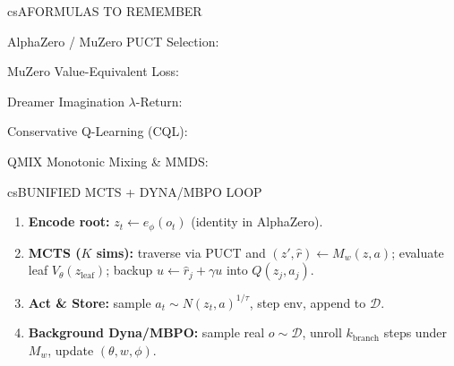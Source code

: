 \documentclass[../../../../master.tex]{subfiles}
\begin{document}
\begin{cscolumns}
\begin{cscard}{csA}{FORMULAS TO REMEMBER}
  \begin{csbul}
    \item AlphaZero / MuZero PUCT Selection:
    \item MuZero Value-Equivalent Loss:
    \item Dreamer Imagination $\lambda$-Return:
    \item Conservative Q-Learning (CQL):
    \item QMIX Monotonic Mixing \& MMDS:
  \end{csbul}
\end{cscard}

\begin{cscard}{csB}{UNIFIED MCTS + DYNA/MBPO LOOP}
  \begin{enumerate}[leftmargin=1.2em, itemsep=1pt, topsep=1pt, parsep=0pt]
    \item \textbf{Encode root:} $z_t \leftarrow e_\phi(o_t)$ (identity in AlphaZero).
    \item \textbf{MCTS ($K$ sims):} traverse via PUCT and $(z',\hat{r})\leftarrow M_w(z,a)$; evaluate leaf $V_\theta(z_{\mathrm{leaf}})$; backup $u\leftarrow \hat{r}_j+\gamma u$ into $Q(z_j,a_j)$.
    \item \textbf{Act \& Store:} sample $a_t\sim N(z_t,a)^{1/\tau}$, step env, append to $\mathcal{D}$.
    \item \textbf{Background Dyna/MBPO:} sample real $o\sim\mathcal{D}$, unroll $k_{\mathrm{branch}}$ steps under $M_w$, update $(\theta,w,\phi)$.
  \end{enumerate}
\end{cscard}
\columnbreak


\end{cscolumns}
\end{document}

